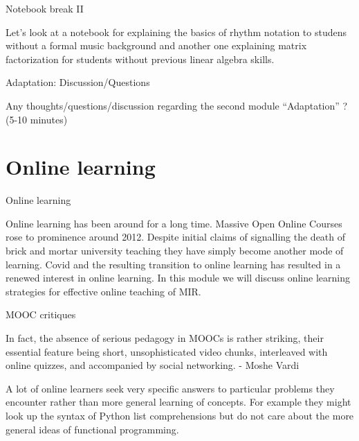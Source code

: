\documentclass[12pt]{beamer}
\begin{document}
\begin{frame}{Notebook break II}

  Let's look at a notebook for explaining the basics of rhythm notation
  to studens without a formal music background and another one explaining
  matrix factorization for students without previous linear algebra skills. 
  
\end{frame}

\begin{frame}{Adaptation: Discussion/Questions}

  Any thoughts/questions/discussion regarding the second module ``Adaptation'' ? (5-10 minutes) 
  
\end{frame}



\section{Online learning}

\begin{frame}{Online learning}

  Online learning has been around for a long time. Massive Open Online
  Courses rose to prominence around 2012. Despite initial claims of
  signalling the death of brick and mortar university teaching they
  have simply become another mode of learning. Covid and the resulting
  transition to online learning has resulted in a renewed interest in online
  learning. In this module we will discuss online learning strategies
  for effective online teaching of MIR.
\end{frame}

\begin{frame}{MOOC critiques}
  
In fact, the absence of serious pedagogy in MOOCs is rather striking,
their essential feature being short, unsophisticated video chunks,
interleaved with online quizzes, and accompanied by social
networking. - Moshe Vardi

A lot of online learners seek very specific answers to particular
problems they encounter rather than more general learning of concepts.
For example they might look up the syntax of Python list comprehensions
but do not care about the more general ideas of functional programming. 

\end{frame}
\end{document}
